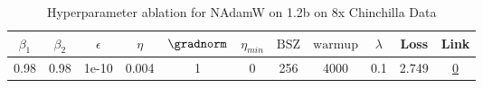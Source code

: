 \begin{table}[H]
\centering
\caption{Hyperparameter ablation for NAdamW on 1.2b on 8x Chinchilla Data}
\label{tab:ablation_nadamw_1.2b_on_8x_chinchilla_data}
\begin{tabular}{ccccccccccc}
\toprule
$\beta_1$ & $\beta_2$ & $\epsilon$ & $\eta$ & $\gradnorm$ & $\eta_{min}$ & $\mathrm{BSZ}$ & $\mathrm{warmup}$ & $\lambda$ & Loss & Link \\
\midrule
0.98 & 0.98 & 1e-10 & 0.004 & 1 & 0 & 256 & 4000 & 0.1 & 2.749 & \href{https://wandb.ai/stanford-mercury/optimizer-scaling/runs/sweep-1.2b-193B-nadamwa486b9lr0.004-wd0.1-minlr0.0-warmup4000-b1-563e6e}{0} \\
\midrule
\bottomrule
\end{tabular}
\end{table}

